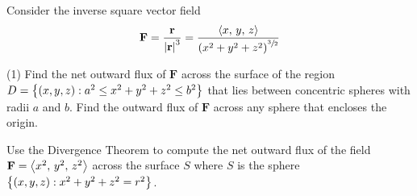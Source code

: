 \documentclass[../mathNotesPreamble]{subfiles}
\begin{document}
  \begin{ex*}
    Consider the inverse square vector field
      \[\mathbf F=\frac{{\mathbf{r}}}{{\left\vert{\mathbf{r}}\right\vert}^3}=\frac{{\left\langle x,\,y,\,z \right\rangle}}{{\left(x^2+y^2+z^2\right)}^{\sfrac{3}{2}}}\]
  \end{ex*}
  \begin{tasks}[after-item-skip=\stretch{1}, label=, item-indent=0pt](1)
    \task Find the net outward flux of $\mathbf F$ across the surface of the region \newline $D={\left\{(x,y,z): a^2\leq x^2+y^2+z^2\leq b^2\right\}}$ that lies between concentric spheres with radii $a$ and $b$.
    \task 
      Find the outward flux of $\mathbf F$ across any sphere that encloses the origin.
  \end{tasks}
  \pagebreak

  \begin{ex*}
    Use the Divergence Theorem to compute the net outward flux of the field $\mathbf F={\left\langle x^2,\,y^2,\,z^2 \right\rangle}$ across the surface $S$ where $S$ is the sphere ${\left\{(x,y,z): x^2+y^2+z^2=r^2\right\}}$.
  \end{ex*}
  \pagebreak
\end{document}
